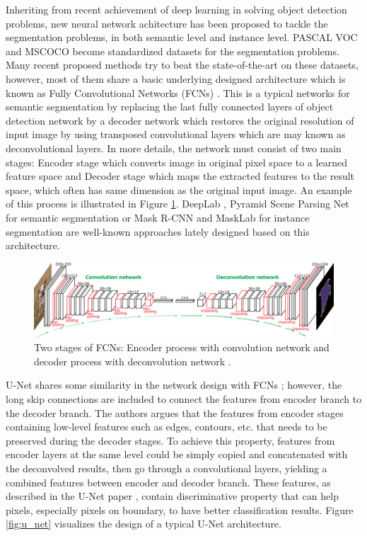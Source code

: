 Inheriting from recent achievement of deep learning in solving object detection problems, new neural network achitecture has been proposed to tackle the segmentation problems, in both semantic level and instance level. PASCAL VOC \cite{PASCALVOCDataset} and MSCOCO \cite{MSCOCODataset} become standardized datasets for the segmentation problems. Many recent proposed methods try to beat the state-of-the-art on these datasets, however, most of them share a basic underlying designed architecture which is known as Fully Convolutional Networks (FCNs) \cite{FCNs}. This is a typical networks for semantic segmentation by replacing the last fully connected layers of object detection network by a decoder network which restores the original resolution of input image by using transposed convolutional layers which are may known as deconvolutional layers. In more details, the network must consist of two main stages: Encoder stage which converts image in original pixel space to a learned feature space and Decoder stage which maps the extracted features to the result space, which often has same dimension as the original input image. An example of this process is illustrated in Figure \ref{fig:CL_DL}. DeepLab \cite{DeepLabv1,DeepLabv2,DeepLabv3,DeepLabv3+}, Pyramid Scene Parsing Net \cite{PSPNet} for semantic segmentation or Mask R-CNN \cite{MaskRCNN} and MaskLab \cite{MaskLab} for instance segmentation are well-known approaches lately designed based on this architecture.

\begin{figure}[thb]
\centering
\includegraphics[width=1\textwidth]{resources/3-conv-deconv.png}
\caption{Two stages of FCNs: Encoder process with convolution network and decoder process with deconvolution network \cite{conv_deconv}.}
\label{fig:CL_DL}
\end{figure}

U-Net \cite{unet} shares some similarity in the network design with FCNs \cite{FCNs}; however, the long skip connections are included to connect the features from encoder branch to the decoder branch. The authors argues that the features from encoder stages containing low-level features such as edges, contours, etc. that needs to be preserved during the decoder stages. To achieve this property, features from encoder layers at the same level could be simply copied and concatenated with the deconvolved results, then go through a convolutional layers, yielding a combined features between encoder and decoder branch. These features, as described in the U-Net paper \cite{unet}, contain discriminative property that can help pixels, especially pixels on boundary, to have better classification results. Figure \ref{fig:u_net} visualizes the design of a typical U-Net architecture.

